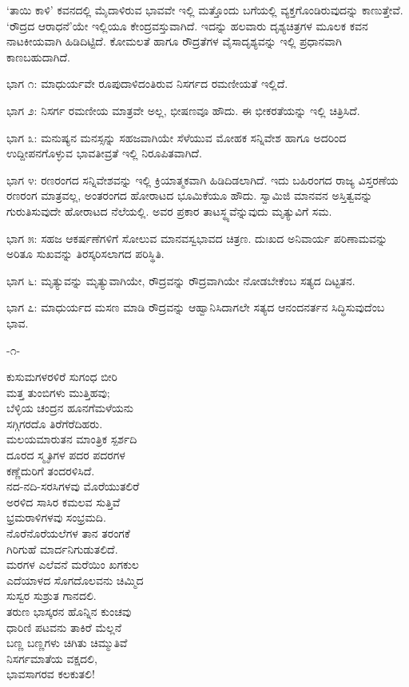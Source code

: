 ‘ತಾಯಿ ಕಾಳಿ’ ಕವನದಲ್ಲಿ ಮೈದಾಳಿರುವ ಭಾವವೇ ಇಲ್ಲಿ ಮತ್ತೊಂದು ಬಗೆಯಲ್ಲಿ ವ್ಯಕ್ತಗೊಂಡಿರುವುದನ್ನು ಕಾಣುತ್ತೇವೆ. ‘ರೌದ್ರದ ಆರಾಧನೆ’ಯೇ ಇಲ್ಲಿಯೂ ಕೇಂದ್ರವಸ್ತುವಾಗಿದೆ. ಇದನ್ನು ಹಲವಾರು ದೃಶ್ಯಚಿತ್ರಗಳ ಮೂಲಕ ಕವನ ನಾಟಕೀಯವಾಗಿ ಹಿಡಿದಿಟ್ಟಿದೆ. ಕೋಮಲತೆ ಹಾಗೂ ರೌದ್ರತೆಗಳ ವೈಸಾದೃಶ್ಯವನ್ನು ಇಲ್ಲಿ ಪ್ರಧಾನವಾಗಿ ಕಾಣಬಹುದಾಗಿದೆ.

ಭಾಗ ೧: ಮಾಧುರ್ಯವೇ ರೂಪುದಾಳಿದಂತಿರುವ ನಿಸರ್ಗದ ರಮಣೀಯತೆ ಇಲ್ಲಿದೆ.

ಭಾಗ ೨: ನಿಸರ್ಗ ರಮಣೀಯ ಮಾತ್ರವೇ ಅಲ್ಲ, ಭೀಷಣವೂ ಹೌದು. ಈ ಭೀಕರತೆಯನ್ನು ಇಲ್ಲಿ ಚಿತ್ರಿಸಿದೆ.

ಭಾಗ ೩: ಮನುಷ್ಯನ ಮನಸ್ಸನ್ನು ಸಹಜವಾಗಿಯೇ ಸೆಳೆಯುವ ಮೋಹಕ ಸನ್ನಿವೇಶ ಹಾಗೂ ಅದರಿಂದ ಉದ್ದೀಪನಗೊಳ್ಳುವ ಭಾವತೀವ್ರತೆ ಇಲ್ಲಿ ನಿರೂಪಿತವಾಗಿದೆ.

ಭಾಗ ೪: ರಣರಂಗದ ಸನ್ನಿವೇಶವನ್ನು ಇಲ್ಲಿ ಕ್ರಿಯಾತ್ಮಕವಾಗಿ ಹಿಡಿದಿಡಲಾಗಿದೆ. ಇದು ಬಹಿರಂಗದ ರಾಜ್ಯ ವಿಸ್ತರಣೆಯ ರಣರಂಗ ಮಾತ್ರವಲ್ಲ, ಅಂತರಂಗದ ಹೋರಾಟದ ಭೂಮಿಕೆಯೂ ಹೌದು. ಸ್ವಾಮಿಜಿ ಮಾನವನ ಅಸ್ತಿತ್ವವನ್ನು ಗುರುತಿಸುವುದೇ ಹೋರಾಟದ ನೆಲೆಯಲ್ಲಿ. ಅವರ ಪ್ರಕಾರ ತಾಟಸ್ಥ್ಯವೆನ್ನುವುದು ಮೃತ್ಯುವಿಗೆ ಸಮ.

ಭಾಗ ೫: ಸಹಜ ಆಕರ್ಷಣೆಗಳಿಗೆ ಸೋಲುವ ಮಾನವಸ್ವಭಾವದ ಚಿತ್ರಣ. ದುಃಖದ ಅನಿವಾರ್ಯ ಪರಿಣಾಮವನ್ನು ಅರಿತೂ ಸುಖವನ್ನು ತಿರಸ್ಕರಿಸಲಾಗದ ಪರಿಸ್ಥಿತಿ.

ಭಾಗ ೬: ಮೃತ್ಯುವನ್ನು ಮೃತ್ಯುವಾಗಿಯೇ, ರೌದ್ರವನ್ನು ರೌದ್ರವಾಗಿಯೇ ನೋಡಬೇಕೆಂಬ ಸತ್ಯದ ದಿಟ್ಟತನ.

ಭಾಗ ೭: ಮಾಧುರ್ಯದ ಮಸಣ ಮಾಡಿ ರೌದ್ರವನ್ನು ಆಹ್ವಾನಿಸಿದಾಗಲೇ ಸತ್ಯದ ಆನಂದನರ್ತನ ಸಿದ್ಧಿಸುವುದೆಂಬ ಭಾವ.

\begin{center}
-೧-
\end{center}

ಕುಸುಮಗಳರಳಿರೆ ಸುಗಂಧ ಬೀರಿ\\ಮತ್ತ ತುಂಬಿಗಳು ಮುತ್ತಿಹವು;\\ಬೆಳ್ಳಿಯ ಚಂದ್ರನ ಹೂನಗೆಮಳೆಯನು\\ಸಗ್ಗಿಗರದೊ ತಿರೆಗೆರೆದಿಹರು.\\ಮಲಯಮಾರುತನ ಮಾಂತ್ರಿಕ ಸ್ಪರ್ಶದಿ\\ದೂರದ ಸ್ಮೃತಿಗಳ ಪದರ ಪದರಗಳ\\ಕಣ್ಣೆದುರಿಗೆ ತಂದರಳಿಸಿದೆ.\\ನದ-ನದಿ-ಸರಸಿಗಳವು ಮೊರೆಯುತಲಿರೆ\\ಅರಳಿದ ಸಾಸಿರ ಕಮಲವ ಸುತ್ತಿವೆ\\ಭ್ರಮರಾಳಿಗಳವು ಸಂಭ್ರಮದಿ.\\ನೊರೆನೊರೆಯಲೆಗಳ ತಾನ ತರಂಗಕೆ\\ಗಿರಿಗುಹೆ ಮಾರ್ದನಿಗುಡುತಲಿದೆ.\\ಮರಗಳ ಎಲೆವನೆ ಮರೆಯಿಂ ಖಗಕುಲ\\ಎದೆಯಾಳದ ಸೊಗದೊಲವನು ಚಿಮ್ಮಿದ\\ಸುಸ್ವರ ಸುಶ್ರುತ ಗಾನದಲಿ.\\ತರುಣ ಭಾಸ್ಕರನ ಹೊನ್ನಿನ ಕುಂಚವು\\ಧಾರಿಣಿ ಪಟವನು ತಾಕಿರೆ ಮೆಲ್ಲನೆ\\ಬಣ್ಣ ಬಣ್ಣಗಳು ಚಿಗಿತು ಚಿಮ್ಮುತಿವೆ\\ನಿಸರ್ಗಮಾತೆಯ ವಕ್ಷದಲಿ,\\ಭಾವಸಾಗರವ ಕಲಕುತಲಿ!

